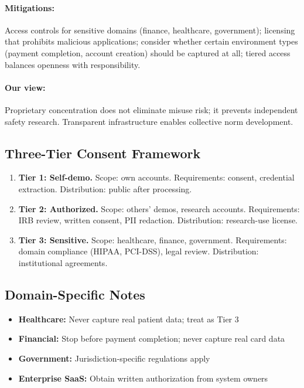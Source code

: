\documentclass[letterpaper]{article}
\begin{document}
\paragraph{Mitigations:} Access controls for sensitive domains (finance, healthcare, government); licensing that prohibits malicious applications; consider whether certain environment types (payment completion, account creation) should be captured at all; tiered access balances openness with responsibility.

\paragraph{Our view:} Proprietary concentration does not eliminate misuse risk; it prevents independent safety research. Transparent infrastructure enables collective norm development.

\subsection{Three-Tier Consent Framework}

\begin{enumerate}
    \item \textbf{Tier 1: Self-demo.} Scope: own accounts. Requirements: consent, credential extraction. Distribution: public after processing.
    \item \textbf{Tier 2: Authorized.} Scope: others' demos, research accounts. Requirements: IRB review, written consent, PII redaction. Distribution: research-use license.
    \item \textbf{Tier 3: Sensitive.} Scope: healthcare, finance, government. Requirements: domain compliance (HIPAA, PCI-DSS), legal review. Distribution: institutional agreements.
\end{enumerate}

\subsection{Domain-Specific Notes}

\begin{itemize}
    \item \textbf{Healthcare:} Never capture real patient data; treat as Tier 3
    \item \textbf{Financial:} Stop before payment completion; never capture real card data
    \item \textbf{Government:} Jurisdiction-specific regulations apply
    \item \textbf{Enterprise SaaS:} Obtain written authorization from system owners
\end{itemize}
\end{document}

